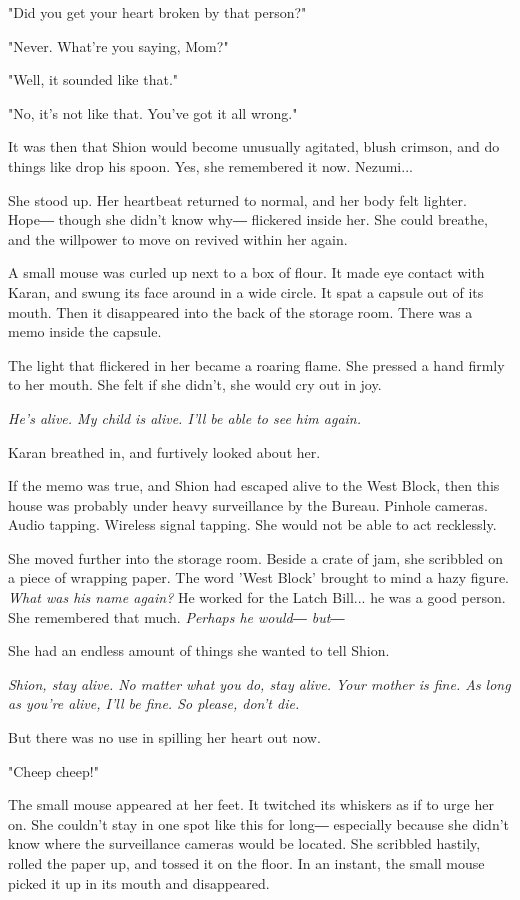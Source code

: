"Did you get your heart broken by that person?"

"Never. What're you saying, Mom?"

"Well, it sounded like that."

"No, it's not like that. You've got it all wrong."

It was then that Shion would become unusually agitated, blush crimson,
and do things like drop his spoon. Yes, she remembered it now. Nezumi...

She stood up. Her heartbeat returned to normal, and her body felt
lighter. Hope― though she didn't know why― flickered inside her. She
could breathe, and the willpower to move on revived within her again.

A small mouse was curled up next to a box of flour. It made eye contact
with Karan, and swung its face around in a wide circle. It spat a
capsule out of its mouth. Then it disappeared into the back of the
storage room. There was a memo inside the capsule.


The light that flickered in her became a roaring flame. She pressed a
hand firmly to her mouth. She felt if she didn't, she would cry out in
joy.

\emph{He's alive. My child is alive. I'll be able to see him again.}

Karan breathed in, and furtively looked about her.

If the memo was true, and Shion had escaped alive to the West Block,
then this house was probably under heavy surveillance by the Bureau.
Pinhole cameras. Audio tapping. Wireless signal tapping. She would not
be able to act recklessly.

She moved further into the storage room. Beside a crate of jam, she
scribbled on a piece of wrapping paper. The word 'West Block' brought to
mind a hazy figure. \emph{What was his name again?} He worked for the Latch
Bill... he was a good person. She remembered that much. \emph{Perhaps he
would― but―}

She had an endless amount of things she wanted to tell Shion.

\emph{Shion, stay alive. No matter what you do, stay alive. Your mother is
fine. As long as you're alive, I'll be fine. So please, don't die.}

But there was no use in spilling her heart out now.

"Cheep cheep!"

The small mouse appeared at her feet. It twitched its whiskers as if to
urge her on. She couldn't stay in one spot like this for long―
especially because she didn't know where the surveillance cameras would
be located. She scribbled hastily, rolled the paper up, and tossed it on
the floor. In an instant, the small mouse picked it up in its mouth and
disappeared.

